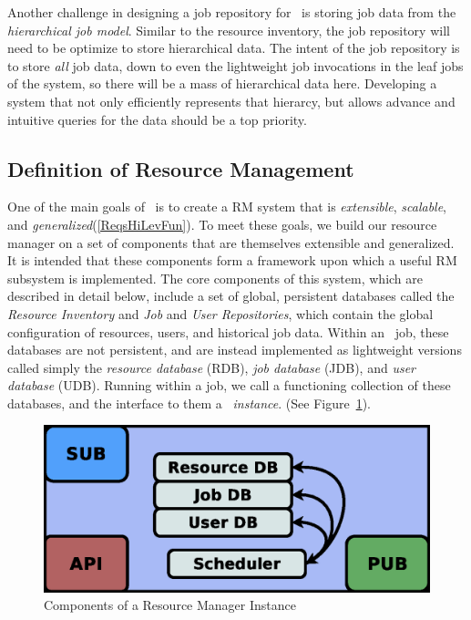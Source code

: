 Another challenge in designing a job repository for \ngrm\ is
storing job data from the \emph{hierarchical job model}. Similar
to the resource inventory, the job repository will need to be
optimize to store hierarchical data. The intent of the job
repository is to store \emph{all} job data, down to even the
lightweight job invocations in the leaf jobs of the system,
so there will be a mass of hierarchical data here. Developing
a system that not only efficiently represents that hierarcy,
but allows advance and intuitive queries for the data should
be a top priority.

\subsection{Definition of Resource Management}

One of the main goals of \ngrm\ is to create a RM system
that is {\em extensible}, {\em scalable}, and {\em
generalized}(\ref{ReqsHiLevFun}). To meet these goals, we
build our resource manager on a set of components that are
themselves extensible and generalized. It is intended that
these components form a framework upon which a useful RM
subsystem is implemented. The core components of this system,
which are described in detail below, include a set of global,
persistent databases called the {\em Resource Inventory} and
{\em Job} and {\em User Repositories}, which contain the global
configuration of resources, users, and historical job data. Within
an \ngrm\ job, these databases are not persistent, and are instead
implemented as lightweight versions called simply the {\em resource
database} (RDB), {\em job database} (JDB), and {\em user database}
(UDB). Running within a job, we call a functioning collection of
these databases, and the interface to them a \ngrm\ {\em instance}.
(See Figure~\ref{RMInstance}).


\begin{figure}
\centering
\includegraphics[scale=0.30]{../fig/RM-instance.eps}
\caption{Components of a Resource Manager Instance}
\label{RMInstance}
\end{figure}

